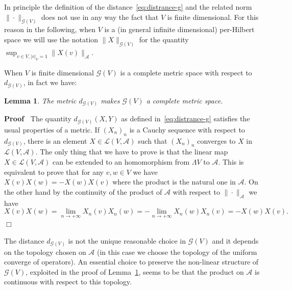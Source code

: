\documentclass{article}
\newenvironment{proof}{\noindent\textbf{Proof\ }}{\hspace*{\fill}$\Box$\medskip}
\newtheorem{lemma}[theorem]{Lemma}
\begin{document}
\begin{remark}
  \label{remark_infinitenorm}In principle the definition of the
  distance~{\eqref{eq:distrance-g}} and the related norm $\| \cdot
  \|_{\mathcal{G} (V)}$ does not use in any way the fact that $V$ is finite
  dimensional. For this reason in the following, when $V$ is a (in general
  infinite dimensional) per-Hilbert space we will use the notation $\| X
  \|_{\mathcal{G} (V)}$ for the quantity $\sup_{v \in V, | v |_V = 1} \| X (v)
  \|_{\mathcal{A}}$.
\end{remark}

When $V$ is finite dimensional $\mathcal{G} (V)$ is a complete metric space
with respect to $d_{\mathcal{G} (V)}$, in fact we have:

\begin{lemma}
  \label{lemma_completeness}The metric $d_{\mathcal{G} (V)}$ makes
  $\mathcal{G} (V)$ a complete metric space.
\end{lemma}

\begin{proof}
  The quantity $d_{\mathcal{G} (V)} (X, Y)$ as defined
  in~{\eqref{eq:distrance-g}} satisfies the usual properties of a metric. If
  $(X_n)_n$ is a Cauchy sequence with respect to $d_{\mathcal{G} (V)}$, there
  is an element $X \in \mathcal{L} (V, \mathcal{A})$ such that $(X_n)_n$
  converges to $X$ in $\mathcal{L} (V, \mathcal{A})$. The only thing that we
  have to prove is that the linear map $X \in \mathcal{L} (V, \mathcal{A})$
  can be extended to an homomorphism from $\Lambda V$ to $\mathcal{A}$. This
  is equivalent to prove that for any $v, w \in V$ we have $X (v) X (w) = - X
  (w) X (v)$ where the product is the natural one in $\mathcal{A}$. On the
  other hand by the continuity of the product of $\mathcal{A}$ with respect to
  $\| \cdot \|_{\mathcal{A}}$ we have
  \[ X (v) X (w) = \lim_{n \rightarrow + \infty} X_n (v) X_n (w) = - \lim_{n
     \rightarrow + \infty} X_n (w) X_n (v) = - X (w) X (v) . \]
\end{proof}

\begin{remark}
  The distance $d_{\mathcal{G} (V)}$ is not the unique reasonable choice in
  $\mathcal{G} (V)$ and it depends on the topology chosen on $\mathcal{A}$ (in
  this case we choose the topology of the uniform converge of operators). An
  essential choice to preserve the non-linear structure of $\mathcal{G} (V)$,
  exploited in the proof of Lemma~\ref{lemma_completeness}, seems to be that
  the product on $\mathcal{A}$ is continuous with respect to this topology. 
\end{remark}
\end{document}
